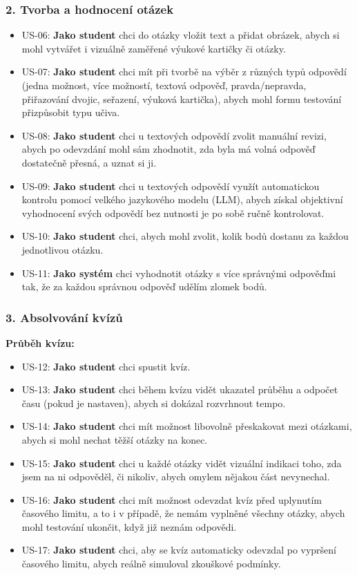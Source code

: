 \documentclass{vskpou} %
\begin{document}
\subsubsection*{2. Tvorba a hodnocení otázek}
\begin{itemize}
    \item US-06: \textbf{Jako student} chci do otázky vložit text a přidat obrázek, abych si mohl vytvářet i vizuálně zaměřené výukové kartičky či otázky.
    \item US-07: \textbf{Jako student} chci mít při tvorbě na výběr z různých typů odpovědí (jedna možnost, více možností, textová odpověď, pravda/nepravda, přiřazování dvojic, seřazení, výuková kartička), abych mohl formu testování přizpůsobit typu učiva.
    \item US-08: \textbf{Jako student} chci u textových odpovědí zvolit manuální revizi, abych po odevzdání mohl sám zhodnotit, zda byla má volná odpověď dostatečně přesná, a uznat si ji.
    \item US-09: \textbf{Jako student} chci u textových odpovědí využít automatickou kontrolu pomocí velkého jazykového modelu (LLM), abych získal objektivní vyhodnocení svých odpovědí bez nutnosti je po sobě ručně kontrolovat.
    \item US-10: \textbf{Jako student} chci, abych mohl zvolit, kolik bodů dostanu za každou jednotlivou otázku.
    \item US-11: \textbf{Jako systém} chci vyhodnotit otázky s více správnými odpověďmi tak, že za každou správnou odpověď udělím zlomek bodů.
\end{itemize}

\subsubsection*{3. Absolvování kvízů}
\textbf{Průběh kvízu:}
\begin{itemize}
    \item US-12: \textbf{Jako student} chci spustit kvíz.
    \item US-13: \textbf{Jako student} chci během kvízu vidět ukazatel průběhu a odpočet času (pokud je nastaven), abych si dokázal rozvrhnout tempo.
    \item US-14: \textbf{Jako student} chci mít možnost libovolně přeskakovat mezi otázkami, abych si mohl nechat těžší otázky na konec.
    \item US-15: \textbf{Jako student} chci u každé otázky vidět vizuální indikaci toho, zda jsem na ni odpověděl, či nikoliv, abych omylem nějakou část nevynechal.
    \item US-16: \textbf{Jako student} chci mít možnost odevzdat kvíz před uplynutím časového limitu, a to i v případě, že nemám vyplněné všechny otázky, abych mohl testování ukončit, když již neznám odpovědi.
    \item US-17: \textbf{Jako student} chci, aby se kvíz automaticky odevzdal po vypršení časového limitu, abych reálně simuloval zkouškové podmínky.
\end{itemize}
\end{document}
